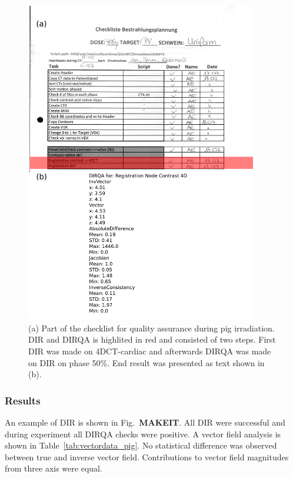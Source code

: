 \documentclass[type=dr, dr=rernat, accentcolor=tud7b,colorbacktitle, bigchapter, openright, twoside, 12pt ]{tudthesis}
\begin{document}
\newpage
\begin{figure}[H]
	\begin{center}		
		\includegraphics[width=0.9\textwidth]{./Images/checkList.png}
		\caption{(a) Part of the checklist for quality assurance during pig irradiation. DIR and DIRQA is highlited in red and consisted of two steps. First DIR was made on 4DCT-cardiac and afterwards DIRQA was made on
		DIR on phase 50\%. End result was presented as text shown in (b).}
		\label{checkList}
	\end{center}
\end{figure}
\newpage

\subsubsection{Results}


An example of DIR is shown in Fig.~\textbf{MAKEIT}. All DIR were successful and during experiment all DIRQA checks were positive. A vector field analysis is shown in Table~\ref{tab:vectordata_pig}. No statistical difference was
observed between true and inverse vector field. Contributions to vector field magnitudes from three axis were equal. 
\end{document}
